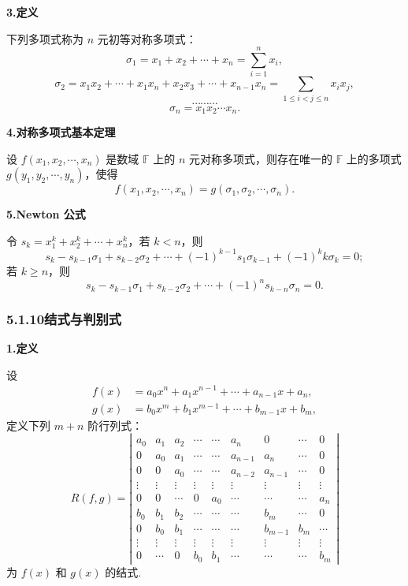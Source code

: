 \documentclass[UTF8,12pt,a4paper,fontset=fandol]{ctexart}
\begin{document}
\noindent\textbf{3.\quad 定义}

下列多项式称为 $n$ 元初等对称多项式：
\[
\sigma_1=x_1+x_2+\cdots+x_n=\sum_{i=1}^n x_i,
\]
\[
\sigma_2=x_1x_2+\cdots+x_1x_n+x_2x_3+\cdots+x_{n-1}x_n
=\sum_{1\le i<j\le n}x_ix_j,
\]
\[
\cdots\cdots\cdots
\]
\[
\sigma_n=x_1x_2\cdots x_n.
\]

\noindent\textbf{4.\quad 对称多项式基本定理}

设 $f(x_1,x_2,\cdots,x_n)$ 是数域 $\mathbb{F}$ 上的 $n$ 元对称多项式，则存在唯一的 $\mathbb{F}$ 上的多项式 $g(y_1,y_2,\cdots,y_n)$，使得
\[
f(x_1,x_2,\cdots,x_n)=g(\sigma_1,\sigma_2,\cdots,\sigma_n).
\]

\noindent\textbf{5.\quad Newton 公式}

令 $s_k=x_1^k+x_2^k+\cdots+x_n^k$，若 $k<n$，则
\[
s_k-s_{k-1}\sigma_1+s_{k-2}\sigma_2+\cdots+(-1)^{k-1}s_1\sigma_{k-1}+(-1)^k k\sigma_k=0;
\]
若 $k\ge n$，则
\[
s_k-s_{k-1}\sigma_1+s_{k-2}\sigma_2+\cdots+(-1)^n s_{k-n}\sigma_n=0.
\]

\subsubsection*{5.1.10\quad 结式与判别式}

\noindent\textbf{1.\quad 定义}

设
\[
\begin{aligned}
f(x)&=a_0x^n+a_1x^{n-1}+\cdots+a_{n-1}x+a_n,\\
g(x)&=b_0x^m+b_1x^{m-1}+\cdots+b_{m-1}x+b_m,
\end{aligned}
\]
定义下列 $m+n$ 阶行列式：
\[
R(f,g)=
\left|\begin{array}{ccccccccc}
a_0 & a_1 & a_2 & \cdots & \cdots & a_n & 0 & \cdots & 0\\
0 & a_0 & a_1 & \cdots & \cdots & a_{n-1} & a_n & \cdots & 0\\
0 & 0 & a_0 & \cdots & \cdots & a_{n-2} & a_{n-1} & \cdots & 0\\
\vdots & \vdots & \vdots & \vdots & \vdots & \vdots & \vdots & \vdots & \vdots\\
0 & 0 & \cdots & 0 & a_0 & \cdots & \cdots & \cdots & a_n\\
b_0 & b_1 & b_2 & \cdots & \cdots & \cdots & b_m & \cdots & 0\\
0 & b_0 & b_1 & \cdots & \cdots & \cdots & b_{m-1} & b_m & \cdots\\
\vdots & \vdots & \vdots & \vdots & \vdots & \vdots & \vdots & \vdots & \vdots\\
0 & \cdots & 0 & b_0 & b_1 & \cdots & \cdots & \cdots & b_m
\end{array}\right|
\]
为 $f(x)$ 和 $g(x)$ 的结式.
\end{document}
